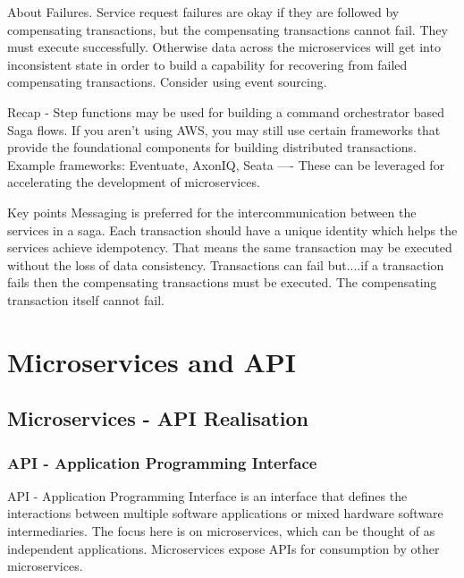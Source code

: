 \documentclass[a4paper, 11pt]{book}
\begin{document}
    About Failures.
    Service request failures are okay if they are followed by compensating transactions, but the compensating transactions cannot fail.
    They must execute successfully.
    Otherwise data across the microservices will get into inconsistent state in order to build a capability for recovering from failed compensating transactions.
    Consider using event sourcing.

    Recap - Step functions may be used for building a command orchestrator based Saga flows.
    If you aren't using AWS, you may still use certain frameworks that provide the foundational components for building distributed transactions.
    Example frameworks: Eventuate, AxonIQ, Seata ---- These can be leveraged for accelerating the development of microservices.

    Key points
    Messaging is preferred for the intercommunication between the services in a saga.
    Each transaction should have a unique identity which helps the services achieve idempotency.
    That means the same transaction may be executed without the loss of data consistency.
    Transactions can fail but....if a transaction fails then the compensating transactions must be executed.
    The compensating transaction itself cannot fail.



    \chapter{Microservices and API}


    \section{Microservices - API Realisation}

    \subsection{API - Application Programming Interface}
    API - Application Programming Interface is an interface that defines the interactions between multiple software applications or mixed hardware software intermediaries.
    The focus here is on microservices, which can be thought of as independent applications.
    Microservices expose APIs for consumption by other microservices.
\end{document}

